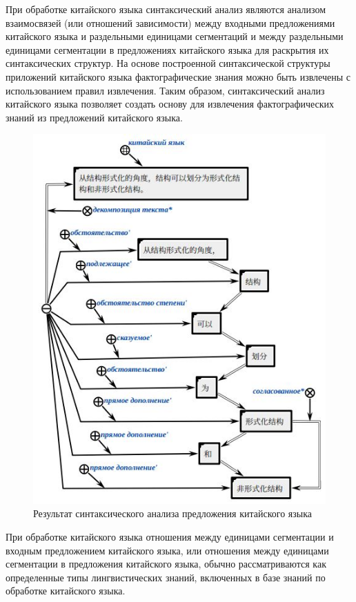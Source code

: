 При обработке китайского языка синтаксический анализ являются анализом взаимосвязей (или отношений зависимости) между входными предложениями китайского языка и раздельными единицами сегментаций и между раздельными единицами сегментации в предложениях китайского языка для раскрытия их синтаксических структур. На основе построенной синтаксической структуры приложений китайского языка фактографические знания можно быть извлечены с использованием правил извлечения. Таким образом, синтаксический анализ китайского языка позволяет создать основу для извлечения фактографических знаний из предложений китайского языка.
\begin{figure}[H]
	\centering
	\includegraphics[scale=0.6]{images/part4/chapter_chinese/syntac_structure.png}
	\caption{Результат синтаксического анализа предложения китайского языка}
	\label{fig:syntac-structure}
\end{figure}

При обработке китайского языка отношения между единицами сегментации и входным предложением китайского языка, или отношения между единицами сегментации в предложения китайского языка, обычно рассматриваются как определенные типы лингвистических знаний, включенных в базе знаний по обработке китайского языка.

